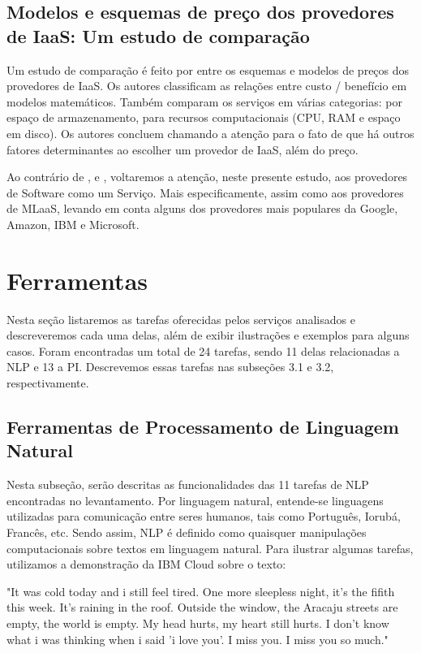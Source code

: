 \documentclass{article}
\begin{document}
\subsection{Modelos e esquemas de preço dos provedores de IaaS: Um estudo de comparação}
Um estudo de comparação é feito por \cite{murthy2012pricing} entre os esquemas e modelos de preços dos provedores de IaaS. Os autores classificam as relações entre custo / benefício em modelos matemáticos. Também comparam os serviços em várias categorias: por espaço de armazenamento, para recursos computacionais (CPU, RAM e espaço em disco). Os autores concluem chamando a atenção para o fato de que há outros fatores determinantes ao escolher um provedor de IaaS, além do preço.

Ao contrário de \cite{peng2009comparison}, \cite{hyseni2017comparison} e \cite{murthy2012pricing}, voltaremos a atenção, neste presente estudo, aos provedores de Software como um Serviço. Mais especificamente, assim como \cite{yao2017} aos provedores de MLaaS, levando em conta alguns dos provedores mais populares da Google, Amazon, IBM e Microsoft. 


\section{Ferramentas}
Nesta seção listaremos as tarefas oferecidas pelos serviços analisados e descreveremos cada uma delas, além de exibir ilustrações e exemplos para alguns casos. Foram encontradas um total de 24 tarefas, sendo 11 delas relacionadas a NLP e 13 a PI. Descrevemos essas tarefas nas subseções 3.1 e 3.2, respectivamente.

\subsection{Ferramentas de Processamento de Linguagem Natural}
Nesta subseção, serão descritas as funcionalidades das 11 tarefas de NLP encontradas no levantamento. Por linguagem natural, entende-se linguagens utilizadas para comunicação entre seres humanos, tais como Português, Iorubá, Francês, etc. Sendo assim, NLP é definido como quaisquer manipulações computacionais sobre textos em linguagem natural\cite{nltk}. Para ilustrar algumas tarefas, utilizamos a demonstração da IBM Cloud sobre o texto: 
\begin{myquote}
        "It was cold today and i still feel tired. One more sleepless night, it's the fifith this week. It's raining in the roof. Outside the window, the Aracaju streets are empty, the world is empty. My head hurts, my heart still hurts. I don't know what i was thinking when i said 'i love you'. I miss you. I miss you so much."
\end{myquote}
\end{document}
